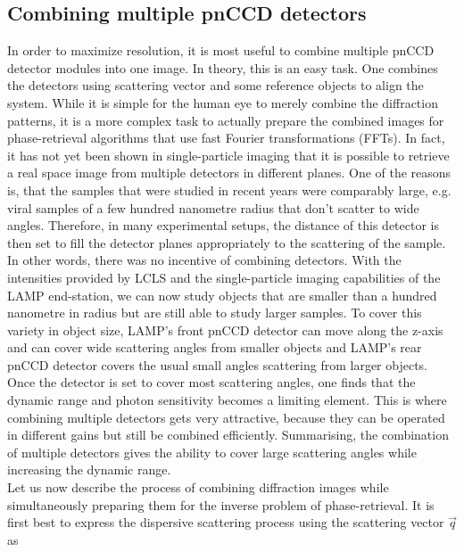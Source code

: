 \subsection{Combining multiple pnCCD detectors}\label{sec:combination-of-images}
In order to maximize resolution, it is most useful to combine multiple pnCCD detector modules into one image. In theory, this is an easy task. One combines the detectors using scattering vector and some reference objects to align the system. While it is simple for the human eye to merely combine the diffraction patterns, it is a more complex task to actually prepare the combined images for phase-retrieval algorithms that use fast Fourier transformations (FFTs). In fact, it has not yet been shown in single-particle imaging that it is possible to retrieve a real space image from multiple detectors in different planes. One of the reasons is, that the samples that were studied in recent years were comparably large, e.g. viral samples of a few hundred nanometre radius that don't scatter to wide angles. Therefore, in many experimental setups, the distance of this detector is then set to fill the detector planes appropriately to the scattering of the sample. In other words, there was no incentive of combining detectors. With the intensities provided by LCLS and the single-particle imaging capabilities of the LAMP end-station, we can now study objects that are smaller than a hundred nanometre in radius but are still able to study larger samples. To cover this variety in object size, LAMP's front pnCCD detector can move along the z-axis and can cover wide scattering angles from smaller objects and LAMP's rear pnCCD detector covers the usual small angles scattering from larger objects. Once the detector is set to cover most scattering angles, one finds that the dynamic range and photon sensitivity becomes a limiting element. This is where combining multiple detectors gets very attractive, because they can be operated in different gains but still be combined efficiently. Summarising, the combination of multiple detectors gives the ability to cover large scattering angles while increasing the dynamic range.\\
Let us now describe the process of combining diffraction images while simultaneously preparing them for the inverse problem of phase-retrieval. It is first best to express the dispersive scattering process using the scattering vector $\vec{q}$ as

